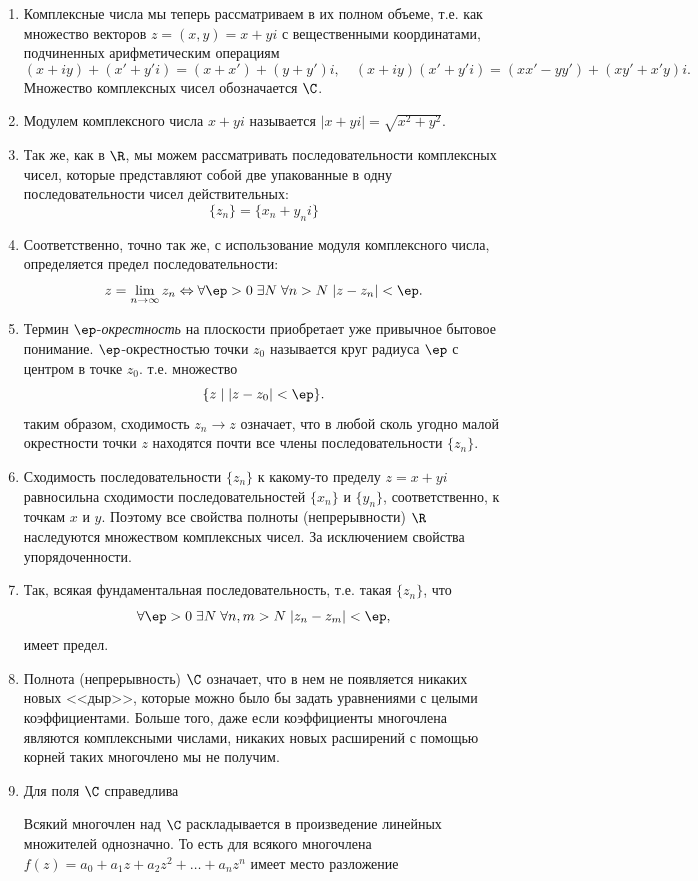 \begin{enumerate}
\item Комплексные числа мы теперь рассматриваем в их полном объеме, т.е. как множество векторов $z=(x,y)=x+yi$ с вещественными координатами, подчиненных арифметическим операциям
$$
(x+iy)+(x'+y'i)=(x+x')+(y+y')i,\quad (x+iy)(x'+y'i)=(xx'-yy')+(xy'+x'y)i.
$$
Множество комплексных чисел обозначается $\C$.
\item Модулем комплексного числа $x+yi$ называется $|x+yi|=\sqrt{x^2+y^2}$.
\item Так же, как в $\R$, мы можем рассматривать последовательности комплексных чисел, которые представляют собой две упакованные в одну последовательности чисел действительных:
$$
\{z_n\} = \{x_n+y_ni\}
$$
\item Соответственно, точно так же, с использование модуля комплексного числа, определяется предел последовательности:
$$
z=\lim_{n\to\infty}z_n\Leftrightarrow\forall\ep>0\;\exists N\;\forall n>N\;|z-z_n|<\ep.
$$
\item Термин $\ep$-\textit{окрестность} на плоскости приобретает уже привычное бытовое понимание. $\ep$-окрестностью точки $z_0$ называется круг радиуса $\ep$ с центром в точке $z_0$. т.е. множество
$$
\{z\mid |z-z_0|<\ep\}.
$$
таким образом, сходимость $z_n\to z$ означает, что в любой сколь угодно малой окрестности точки $z$ находятся почти все члены последовательности $\{z_n\}$.
\item Сходимость последовательности $\{z_n\}$ к какому-то пределу $z=x+yi$ равносильна сходимости последовательностей $\{x_n\}$ и $\{y_n\}$, соответственно, к точкам $x$ и $y$. Поэтому все свойства полноты (непрерывности) $\R$ наследуются множеством комплексных чисел. За исключением свойства упорядоченности.
\item Так, всякая фундаментальная последовательность, т.е. такая $\{z_n\}$, что
$$
\forall\ep>0\;\exists N\;\forall n,m>N\;|z_n-z_m|<\ep,
$$
имеет предел.
\item Полнота (непрерывность) $\C$ означает, что в нем не появляется никаких новых <<дыр>>, которые можно было бы задать уравнениями с целыми коэффициентами. Больше того, даже если коэффициенты многочлена являются комплексными числами, никаких новых расширений с помощью корней таких многочлено мы не получим.
\item Для поля $\C$ справедлива
\begin{thrm}
Всякий многочлен над $\C$ раскладывается в произведение линейных множителей однозначно. То есть для всякого многочлена $f(z)=a_0+a_1z+a_2z^2+\dots+a_nz^n$ имеет место разложение

\end{thrm}
\end{enumerate}

